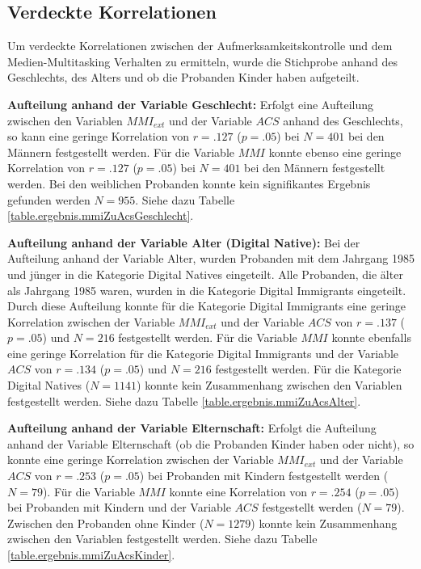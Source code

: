 \subsection{Verdeckte Korrelationen}
Um verdeckte Korrelationen zwischen der Aufmerksamkeitskontrolle und dem Medien-Multitasking Verhalten zu ermitteln, wurde die Stichprobe anhand des Geschlechts, des Alters und ob die Probanden Kinder haben aufgeteilt.
\par
\textbf{Aufteilung anhand der Variable Geschlecht:} Erfolgt eine Aufteilung zwischen den Variablen $MMI_{ext}$ und der Variable $ACS$ anhand des Geschlechts, so kann eine geringe Korrelation von $r=.127$ ($p=.05$) bei $N=401$ bei den Männern festgestellt werden. Für die Variable $MMI$ konnte ebenso eine geringe Korrelation von $r=.127$ ($p=.05$) bei $N=401$ bei den Männern festgestellt werden. Bei den weiblichen Probanden konnte kein signifikantes Ergebnis gefunden werden $N=955$. Siehe dazu Tabelle \ref{table.ergebnis.mmiZuAcsGeschlecht}.
\par
\textbf{Aufteilung anhand der Variable Alter (Digital Native):} Bei der Aufteilung anhand der Variable Alter, wurden Probanden mit dem Jahrgang 1985 und jünger in die Kategorie Digital Natives eingeteilt. Alle Probanden, die älter als Jahrgang 1985 waren, wurden in die Kategorie Digital Immigrants eingeteilt. Durch diese Aufteilung konnte für die Kategorie Digital Immigrants eine geringe Korrelation zwischen der Variable $MMI_{ext}$ und der Variable $ACS$ von $r=.137$ ($p=.05$) und $N=216$ festgestellt werden. Für die Variable $MMI$ konnte ebenfalls eine geringe Korrelation für die Kategorie Digital Immigrants und der Variable $ACS$ von $r=.134$ ($p=.05$) und $N=216$ festgestellt werden. Für die Kategorie Digital Natives ($N=1141$) konnte kein Zusammenhang zwischen den Variablen festgestellt werden. Siehe dazu Tabelle \ref{table.ergebnis.mmiZuAcsAlter}.
\par
\textbf{Aufteilung anhand der Variable Elternschaft:} Erfolgt die Aufteilung anhand der Variable Elternschaft (ob die Probanden Kinder haben oder nicht), so konnte eine geringe Korrelation zwischen der Variable $MMI_{ext}$ und der Variable $ACS$ von $r=.253$ ($p=.05$) bei Probanden mit Kindern festgestellt werden ($N=79$). Für die Variable $MMI$ konnte eine Korrelation von $r=.254$ ($p=.05$) bei Probanden mit Kindern und der Variable $ACS$ festgestellt werden ($N=79$). Zwischen den Probanden ohne Kinder ($N=1279$) konnte kein Zusammenhang zwischen den Variablen festgestellt werden. Siehe dazu Tabelle \ref{table.ergebnis.mmiZuAcsKinder}.

